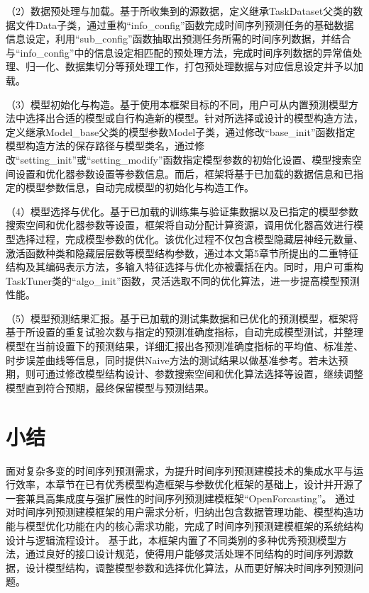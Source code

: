 （2）数据预处理与加载。基于所收集到的源数据，定义继承TaskDataset父类的数据文件Data子类，通过重构“info_config”函数完成时间序列预测任务的基础数据信息设定，利用“sub_config”函数抽取出预测任务所需的时间序列数据，并结合与“info_config”中的信息设定相匹配的预处理方法，完成时间序列数据的异常值处理、归一化、数据集切分等预处理工作，打包预处理数据与对应信息设定并予以加载。

（3）模型初始化与构造。基于使用本框架目标的不同，用户可从内置预测模型方法中选择出合适的模型或自行构造新的模型。针对所选择或设计的模型构造方法，定义继承Model_base父类的模型参数Model子类，通过修改“base_init”函数指定模型构造方法的保存路径与模型类名，通过修改“setting_init”或“setting_modify”函数指定模型参数的初始化设置、模型搜索空间设置和优化器参数设置等参数信息。而后，框架将基于已加载的数据信息和已指定的模型参数信息，自动完成模型的初始化与构造工作。

（4）模型选择与优化。基于已加载的训练集与验证集数据以及已指定的模型参数搜索空间和优化器参数等设置，框架将自动分配计算资源，调用优化器高效进行模型选择过程，完成模型参数的优化。该优化过程不仅包含模型隐藏层神经元数量、激活函数种类和隐藏层层数等模型结构参数，通过本文第5章节所提出的二重特征结构及其编码表示方法，多输入特征选择与优化亦被囊括在内。同时，用户可重构TaskTuner类的“algo_init”函数，灵活选取不同的优化算法，进一步提高模型预测性能。

（5）模型预测结果汇报。基于已加载的测试集数据和已优化的预测模型，框架将基于所设置的重复试验次数与指定的预测准确度指标，自动完成模型测试，并整理模型在当前设置下的预测结果，详细汇报出各预测准确度指标的平均值、标准差、时步误差曲线等信息，同时提供Naive方法的测试结果以做基准参考。若未达预期，则可通过修改模型结构设计、参数搜索空间和优化算法选择等设置，继续调整模型直到符合预期，最终保留模型与预测结果。

\section{小结}
面对复杂多变的时间序列预测需求，为提升时间序列预测建模技术的集成水平与运行效率，本章节在已有优秀模型构造框架与参数优化框架的基础上，设计并开源了一套兼具高集成度与强扩展性的时间序列预测建模框架“OpenForcasting”。
通过对时间序列预测建模框架的用户需求分析，归纳出包含数据管理功能、模型构造功能与模型优化功能在内的核心需求功能，完成了时间序列预测建模框架的系统结构设计与逻辑流程设计。
基于此，本框架内置了不同类别的多种优秀预测模型方法，通过良好的接口设计规范，使得用户能够灵活处理不同结构的时间序列源数据，设计模型结构，调整模型参数和选择优化算法，从而更好解决时间序列预测问题。

